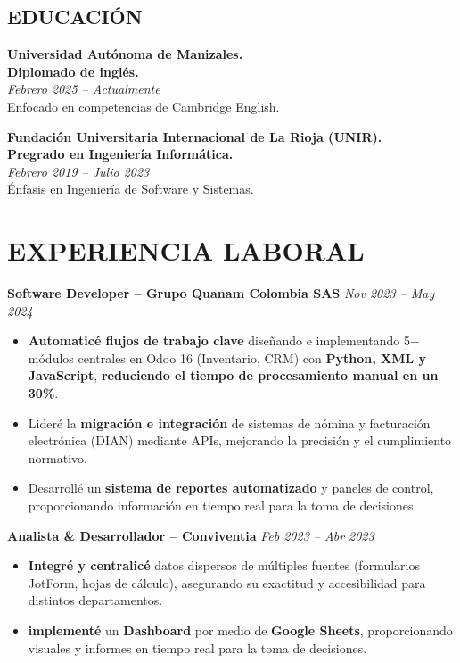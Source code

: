 \documentclass[11pt, a4paper]{article}
\begin{document}
\subsection*{EDUCACIÓN}
\textbf{Universidad Autónoma de Manizales.} \\
\textbf{Diplomado de inglés.} \\
\textit{Febrero 2025 – Actualmente} \\ Enfocado en competencias de Cambridge English.

\textbf{Fundación Universitaria Internacional de La Rioja (UNIR).} \\
\textbf{Pregrado en Ingeniería Informática.} \\
\textit{Febrero 2019 – Julio 2023} \\ Énfasis en Ingeniería de Software y Sistemas.

\section*{EXPERIENCIA LABORAL}
\textbf{Software Developer – Grupo Quanam Colombia SAS} \hfill \textit{Nov 2023 – May 2024}
\begin{itemize}[leftmargin=*, nosep, topsep=4pt]
	\item \textbf{Automaticé flujos de trabajo clave} diseñando e implementando 5+ módulos centrales en Odoo 16 (Inventario, CRM) con \textbf{Python, XML y JavaScript}, \textbf{reduciendo el tiempo de procesamiento manual en un 30\%}.
	\item Lideré la \textbf{migración e integración} de sistemas de nómina y facturación electrónica (DIAN) mediante APIs, mejorando la precisión y el cumplimiento normativo.
	\item Desarrollé un \textbf{sistema de reportes automatizado} y paneles de control, proporcionando información en tiempo real para la toma de decisiones.
\end{itemize}

\textbf{Analista \& Desarrollador – Conviventia} \hfill \textit{Feb 2023 – Abr 2023}
\begin{itemize}[leftmargin=*, nosep, topsep=4pt]
	\item \textbf{Integré y centralicé} datos dispersos de múltiples fuentes (formularios JotForm, hojas de cálculo), asegurando su exactitud y accesibilidad para distintos departamentos.
  \item \textbf{implementé} un \textbf{Dashboard} por medio de \textbf{Google Sheets}, proporcionando visuales y informes en tiempo real para la toma de decisiones.
\end{itemize}
\end{document}
